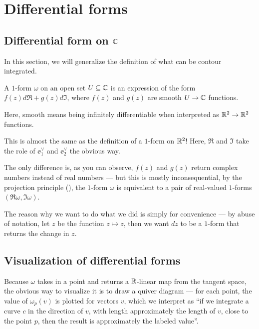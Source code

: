 \chapter{Differential forms}
\label{ch:forms_riemann}

\section{Differential form on $\mathbb C$}

In this section, we will generalize the definition of what can be contour integrated.

\begin{definition}
	A $1$-form $\omega$ on an open set $U \subseteq \mathbb C$ is an expression of the form
	$f(z) d \Re + g(z) d \Im$, where $f(z)$ and $g(z)$ are
	smooth $U \to \mathbb C$ functions.
\end{definition}

Here, smooth means being infinitely differentiable when interpreted as $\mathbb R^2 \to \mathbb R^2$ functions.

This is almost the same as the definition of a $1$-form on $\mathbb R^2$!
Here, $\Re$ and $\Im$ take the role of $\ee_1^\vee$ and $\ee_2^\vee$ the obvious way.

The only difference is, as you can observe, $f(z)$ and $g(z)$ return complex numbers instead of
real numbers --- but this is mostly inconsequential, by the projection principle
(), the $1$-form $\omega$ is equivalent to a pair of real-valued
$1$-forms $(\Re \omega, \Im \omega)$.

The reason why we want to do what we did is simply for convenience --- by abuse of notation,
let $z$ be the function $z \mapsto z$,
then we want $dz$ to be a $1$-form that returns the change in $z$.

\section{Visualization of differential forms}

Because $\omega$ takes in a point and returns a $\mathbb R$-linear map from the tangent space,
the obvious way to visualize it is to draw a quiver diagram --- for each point, the value of
$\omega_p(v)$ is plotted for vectors $v$, which we interpret as ``if we integrate a curve $c$ in the
direction of $v$, with length approximately the length of $v$, close to the point $p$, then the
result is approximately the labeled value''.

